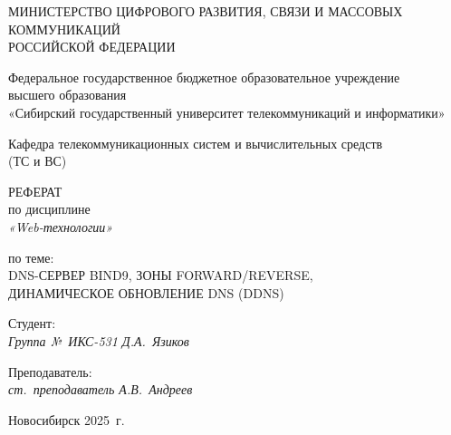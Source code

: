 \documentclass[a4paper,14pt,oneside,openany]{memoir}
\begin{document}
\thispagestyle{empty}

\begin{center}
    МИНИСТЕРСТВО ЦИФРОВОГО РАЗВИТИЯ, СВЯЗИ И МАССОВЫХ КОММУНИКАЦИЙ \\
    РОССИЙСКОЙ ФЕДЕРАЦИИ

    \vspace{20pt}

    Федеральное государственное бюджетное образовательное учреждение \\
    высшего образования \\
    «Сибирский государственный университет телекоммуникаций и информатики» \\

    \vspace{20pt}

    Кафедра телекоммуникационных систем и вычислительных средств \\
    (ТС и ВС)
\end{center}

\vfill

\begin{center}
    РЕФЕРАТ \\
    по дисциплине \\
    \textit{«Web-технологии»}

    \vspace{20pt}

    по теме: \\
    \uppercase{DNS-сервер bind9, зоны forward/reverse,\\
    динамическое обновление DNS (DDNS)}
\end{center}

\vfill

\noindent Студент: \\
\textit{Группа №~ИКС-531 \hfill Д.А.~Язиков}

\vspace{20pt}

\noindent Преподаватель: \\
\textit{ст.~преподаватель \hfill А.В.~Андреев}

\vfill

\begin{center}
    Новосибирск 2025~г.
\end{center}

\newpage
\setcounter{page}{2}
\OnehalfSpacing*
\end{document}

